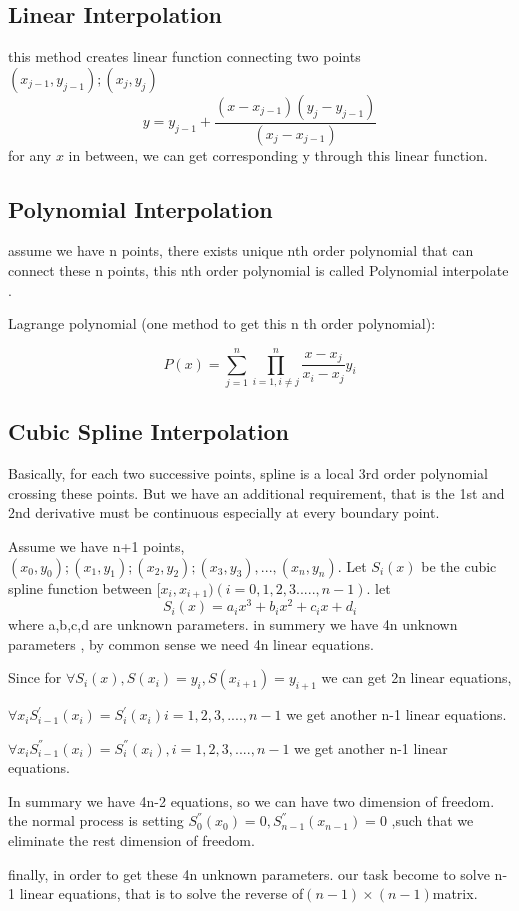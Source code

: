 \documentclass[a4paper]{article}
\begin{document}
\subsection{Linear Interpolation}
this method creates linear function connecting two points $(x_{j-1},y_{j-1});
 (x_{j},y_{j})$
  $$y=y_{j-1}+\frac{(x-x_{j-1})(y_{j}-y_{j-1})}{(x_{j}-x_{j-1})}$$
for any $x$ in between, we can get corresponding y through this linear function.
\subsection{Polynomial Interpolation}
assume we have n points, there exists unique nth order polynomial that can connect these n points, this nth order polynomial is called Polynomial interpolate .
\par
Lagrange polynomial (one method to get this n
 th order polynomial):

$$P(x)=\sum_{j=1}^{n}\prod_{i=1,i\neq j}^{n}\frac{x-x_{j}}{x_{i}-x_{j}}y_{i}$$
\subsection{Cubic Spline Interpolation}
Basically, for each two successive points, spline is a local 3rd order polynomial crossing these points. But we have an additional requirement, that is the 1st and 2nd derivative must be continuous especially at every boundary point.
\par

Assume we have n+1 points,$(x_{0},y_{0}); (x_{1},y_{1})  ;(x_{2},y_{2}); (x_{3},y_{3}),...,(x_{n},y_{n})$. Let $S_{i}(x)$ be the cubic spline function between $[x_{i},x_{i+1})(i=0,1,2,3.....,n-1)$. let $$S_{i}(x)=a_{i}x^{3}+b_{i}x^{2}+c_{i}x+d_{i}$$
where a,b,c,d are unknown parameters. in summery we have 4n unknown parameters , by common sense we need 4n linear equations.
\par
Since for $\forall S_{i}(x),S(x_{i})=y_{i},S(x_{i+1})=y_{i+1}$
  we can get 2n linear equations,

$\forall x_{i}
  S_{i-1}^{'}(x_{i})=S_{i}^{'}(x_{i})i=1,2,3,....,n-1$
  we get another n-1 linear equations.

$\forall x_{i}
  S_{i-1}^{''}(x_{i})=S_{i}^{''}(x_{i}),i=1,2,3,....,n-1$
 we get another n-1 linear equations.
\par
In summary we have 4n-2 equations, so we can have two dimension of freedom. the normal process is setting $S_{0}^{''}(x_{0})=0,S_{n-1}^{''}(x_{n-1})=0$
 ,such that we eliminate the rest dimension of freedom.
\par
finally, in order to get these 4n unknown parameters. our task become to solve n-1 linear equations, that is to solve the reverse of$(n-1)\times(n-1)$matrix.
\end{document}
